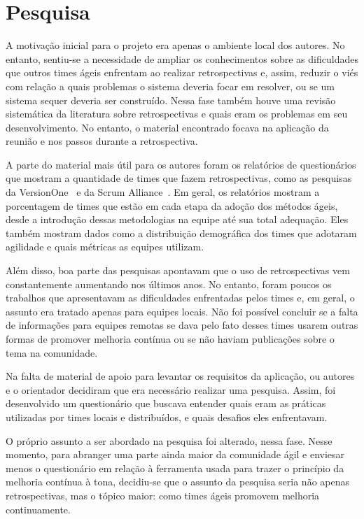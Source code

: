 \section{Pesquisa}

A motivação inicial para o projeto era apenas o ambiente local dos autores. No entanto, sentiu-se a necessidade de ampliar os conhecimentos sobre as dificuldades que outros times ágeis enfrentam ao realizar retrospectivas e, assim, reduzir o viés com relação a quais problemas o sistema deveria focar em resolver, ou se um sistema sequer deveria ser construído. Nessa fase também houve uma revisão sistemática da literatura sobre retrospectivas e quais eram os problemas em seu desenvolvimento. No entanto, o material encontrado focava na aplicação da reunião e nos passos durante a retrospectiva.
  
A parte do material mais útil para os autores foram os relatórios de questionários que mostram a quantidade de times que fazem retrospectivas, como as pesquisas da VersionOne~\cite{versionOne} e da Scrum Alliance~\cite{scrumAlliance}. Em geral, os relatórios mostram a porcentagem de times que estão em cada etapa da adoção dos métodos ágeis, desde a introdução dessas metodologias na equipe até sua total adequação. Eles também mostram dados como a distribuição demográfica dos times que adotaram agilidade e quais métricas as equipes utilizam.

Além disso, boa parte das pesquisas apontavam que o uso de retrospectivas vem constantemente aumentando nos últimos anos. No entanto, foram poucos os trabalhos que apresentavam as dificuldades enfrentadas pelos times e, em geral, o assunto era tratado apenas para equipes locais. Não foi possível concluir se a falta de informações para equipes remotas se dava pelo fato desses times usarem outras formas de promover melhoria contínua ou se não haviam publicações sobre o tema na comunidade.

Na falta de material de apoio para levantar os requisitos da aplicação, ou autores e o orientador decidiram que era necessário realizar uma pesquisa. Assim, foi desenvolvido um questionário que buscava entender quais eram as práticas utilizadas por times locais e distribuídos, e quais desafios eles enfrentavam.

O próprio assunto a ser abordado na pesquisa foi alterado, nessa fase. Nesse momento, para abranger uma parte ainda maior da comunidade ágil e enviesar menos o questionário em relação à ferramenta usada para trazer o princípio da melhoria contínua à tona, decidiu-se que o assunto da pesquisa seria não apenas retrospectivas, mas o tópico maior: como times ágeis promovem melhoria continuamente.

